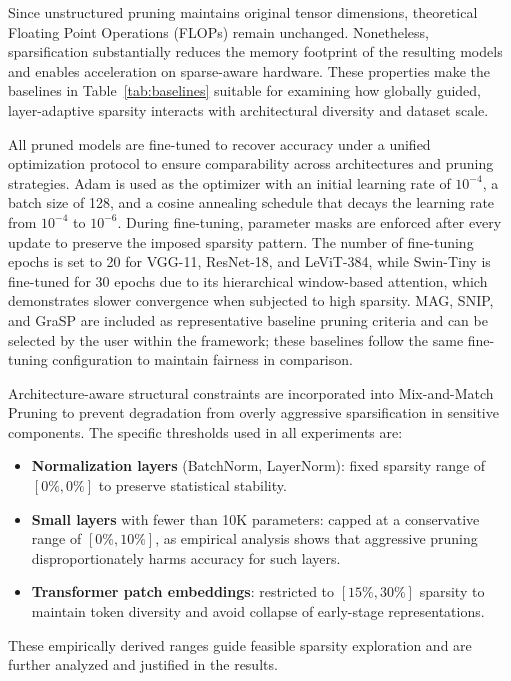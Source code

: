 \documentclass[11pt, conference]{IEEEtran}
\begin{document}
Since unstructured pruning maintains original tensor dimensions, theoretical Floating Point Operations (FLOPs) remain unchanged. Nonetheless, sparsification substantially reduces the memory footprint of the resulting models and enables acceleration on sparse-aware hardware. These properties make the baselines in Table~\ref{tab:baselines} suitable for examining how globally guided, layer-adaptive sparsity interacts with architectural diversity and dataset scale.


All pruned models are fine-tuned to recover accuracy under a unified optimization protocol to ensure comparability across architectures and pruning strategies. Adam is used as the optimizer with an initial learning rate of $10^{-4}$, a batch size of 128, and a cosine annealing schedule that decays the learning rate from $10^{-4}$ to $10^{-6}$. During fine-tuning, parameter masks are enforced after every update to preserve the imposed sparsity pattern. The number of fine-tuning epochs is set to 20 for VGG-11, ResNet-18, and LeViT-384, while Swin-Tiny is fine-tuned for 30 epochs due to its hierarchical window-based attention, which demonstrates slower convergence when subjected to high sparsity. MAG, SNIP, and GraSP are included as representative baseline pruning criteria and can be selected by the user within the framework; these baselines follow the same fine-tuning configuration to maintain fairness in comparison.

Architecture-aware structural constraints are incorporated into Mix-and-Match Pruning to prevent degradation from overly aggressive sparsification in sensitive components. The specific thresholds used in all experiments are:

\begin{itemize}
    \item \textbf{Normalization layers} (BatchNorm, LayerNorm): fixed sparsity range of $[0\%, 0\%]$ to preserve statistical stability.
    \item \textbf{Small layers} with fewer than 10K parameters: capped at a conservative range of $[0\%, 10\%]$, as empirical analysis shows that aggressive pruning disproportionately harms accuracy for such layers.
    \item \textbf{Transformer patch embeddings}: restricted to $[15\%, 30\%]$ sparsity to maintain token diversity and avoid collapse of early-stage representations.
\end{itemize}

These empirically derived ranges guide feasible sparsity exploration and are further analyzed and justified in the results.
\end{document}
